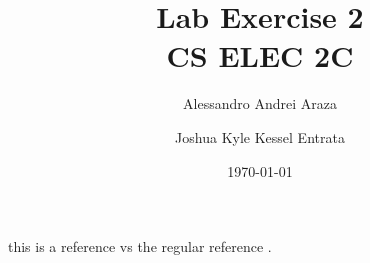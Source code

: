 

\title{{\Huge Lab Exercise 2}\\{\small CS ELEC 2C}}
\author{Alessandro Andrei Araza \and Joshua Kyle Kessel Entrata}
\date{\today}



    \maketitle

    \begin{abstract}

        \vspace{0.5\baselineskip}
        \noindent
    \end{abstract}

    \begin{multicols}{2}
        
        
        
        
        
    \end{multicols}

    \cite{mitlohner_characteristics_2016}

    this is a reference \citep{gaines_emotional_1983} vs the regular reference \cite{gaines_emotional_1983}.
    \nocite{*}

    \newpage
    


